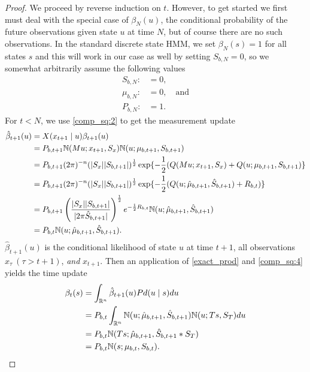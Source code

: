 \documentclass[12pt,leqno]{article}
\begin{document}
\begin{proof}
We proceed by reverse induction on $t$. However, to get started we first must  deal with
the special case of $\beta_{N}(u)$, the conditional probability of the future observations given
state $u$ at time $N$, but of course there are no such observations.  In the standard discrete
state HMM, we set $\beta_N(s) = 1$ for all states $s$ and this will work in our case as well by
setting $S_{b,N} = 0$, so we somewhat arbitrarily assume the following values
\begin{align*}
  S_{b,N} :&= 0,\\
  \mu_{b,N} :&= 0,\quad\text{and}\\
  P_{b,N} :&= 1.
\end{align*}
  For $t <  N$, we use \eqref{comp_sq:2} to get the measurement update 
  \begin{align*}
    \hat{\beta}_{t+1}(u) &= X(x_{t+1}\mid u)\beta_{t+1}(u)\\
    &= P_{b,t+1}{\mathbb N}(Mu;x_{t+1},S_x){\mathbb N}(u;\mu_{b,t+1},S_{b,t+1})\\
    &= P_{b,t+1}(2\pi)^{-n}(|S_x||S_{b,t+1}|)^{\frac{1}{2}}\exp\{-\frac{1}{2}(Q(Mu;x_{t+1},S_x) + Q(u;\mu_{b,t+1},S_{b,t+1}) \} \\
    &= P_{b,t+1}(2\pi)^{-n}(|S_x||S_{b,t+1}|)^{\frac{1}{2}}\exp\{-\frac{1}{2}(Q(u;\hat{\mu}_{b,t+1},\hat{S}_{b,t+1}) + R_{b,t})\}\\
  &= P_{b,t+1}\left(\frac{|S_x||S_{b,t+1}|}{|2\pi \hat{S}_{b,t+1}|}\right)^{\frac{1}{2}}e^{-\frac{1}{2}R_{b,t}}
  {\mathbb N}(u;\hat{\mu}_{b,t+1},\hat{S}_{b,t+1})\\
    &= P_{b,t}{\mathbb N}(u;\hat{\mu}_{b,t+1},\hat{S}_{b,t+1}).
  \end{align*}
  $\hat{\beta}_{t+1}(u)$ is the conditional likelihood of state $u$ at time $t+1$, all observations $x_\tau~(\tau > t+1)$,
      {\em and} $x_{t+1}$. Then an application of \eqref{exact_prod} and \eqref{comp_sq:4} yields the time update
  \begin{align*}
    \beta_t(s) &= \int_{{\mathbb R}^n}\hat{\beta}_{t+1}(u)Pd(u\mid s)du \\
    &= P_{b,t}\int_{{\mathbb R}^n}{\mathbb N}(u;\hat{\mu}_{b,t+1},\hat{S}_{b,t+1}){\mathbb N}(u;Ts,S_T)du\\
    &=P_{b,t}{\mathbb N}(Ts;\hat{\mu}_{b,t+1},\hat{S}_{b,t+1}*S_T)\\
    &=P_{b,t}{\mathbb N}(s;\mu_{b,t},S_{b,t}).
  \end{align*}
\end{proof}
\newpage
\end{document}
